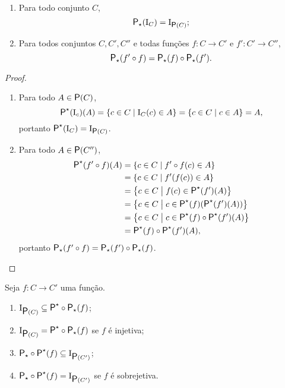 \begin{proposition}
	\begin{enumerate}
	\item Para todo conjunto $C$,
		\begin{equation*}
		\p\emp(\Id_C) = \Id_{\begin{footnotesize}\p\end{footnotesize}(C)};
		\end{equation*}
	\item Para todos conjuntos $C,C',C''$ e todas funções $f\colon C \to C'$ e $f'\colon C' \to C''$,
		\begin{equation*}
		\p\emp(f' \circ f) = \p\emp(f) \circ \p\emp(f').
		\end{equation*}
	\end{enumerate}
\end{proposition}
\begin{proof}
	\begin{enumerate}
	\item Para todo $A \in \p(C)$,
		\begin{equation*}
		\p\pux(\Id_c)(A) = \set{c \in C}{\Id_C(c) \in A} = \set{c \in C}{c \in A} = A,
		\end{equation*}
portanto $\p\pux(\Id_C) = \Id_{\begin{footnotesize}\p\end{footnotesize}(C)}$.

	\item Para todo $A \in \p(C'')$,
		\begin{align*}
		\p\pux(f' \circ f)(A) &= \set{c \in C}{f' \circ f(c) \in A} \\
			&= \set{c \in C}{f'(f(c)) \in A} \\
			&= \set{c \in C}{f(c) \in \p\pux(f')(A)} \\
			&= \set{c \in C}{c \in \p\pux(f)(\p\pux(f')(A))} \\
			&= \set{c \in C}{c \in \p\pux(f) \circ \p\pux(f')(A)} \\
			&= \p\pux(f) \circ \p\pux(f')(A),
		\end{align*}
portanto $\p\emp(f' \circ f) = \p\emp(f') \circ \p\emp(f)$.
	\end{enumerate}
\end{proof}

\begin{proposition}
Seja $f\colon C \to C'$ uma função.
	\begin{enumerate}
	\item $\Id_{\p(C)} \subseteq \p\pux \circ \p\emp(f)$;
	\item $\Id_{\p(C)} = \p\pux \circ \p\emp(f)$ se $f$ é injetiva;
	\item $\p\emp \circ \p\pux(f) \subseteq \Id_{\p(C')}$;
	\item $\p\emp \circ \p\pux(f) = \Id_{\p(C')}$ se $f$ é sobrejetiva.
	\end{enumerate}
\end{proposition}


